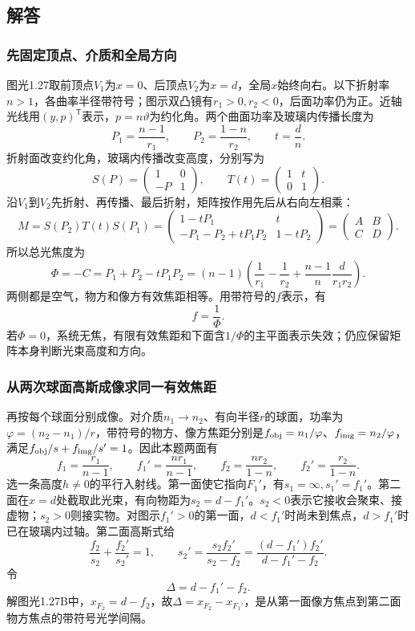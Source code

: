 \documentclass[UTF8,fontset=fandol,a4paper,11pt]{ctexart}
\begin{document}
\subsection*{解答}


\subsubsection*{先固定顶点、介质和全局方向}
图光1.27取前顶点$V_1$为$x=0$、后顶点$V_2$为$x=d$，全局$x$始终向右。以下折射率$n>1$，各曲率半径带符号；图示双凸镜有$r_1>0,r_2<0$，后面功率仍为正。近轴光线用$(y,p)^{\mathsf T}$表示，$p=n\vartheta$为约化角。两个曲面功率及玻璃内传播长度为
\[
P_1=\frac{n-1}{r_1},\qquad
P_2=\frac{1-n}{r_2},\qquad t=\frac dn.
\]
折射面改变约化角，玻璃内传播改变高度，分别写为
\[
S(P)=\begin{pmatrix}1&0\\-P&1\end{pmatrix},
\qquad
T(t)=\begin{pmatrix}1&t\\0&1\end{pmatrix}.
\]
沿$V_1$到$V_2$先折射、再传播、最后折射，矩阵按作用先后从右向左相乘：
\[
M=S(P_2)T(t)S(P_1)
=\begin{pmatrix}
1-tP_1&t\\
-P_1-P_2+tP_1P_2&1-tP_2
\end{pmatrix}
=\begin{pmatrix}A&B\\C&D\end{pmatrix}.
\]
所以总光焦度为
\[
\Phi=-C=P_1+P_2-tP_1P_2
=(n-1)\left(\frac1{r_1}-\frac1{r_2}
+\frac{n-1}{n}\frac d{r_1r_2}\right).
\]
两侧都是空气，物方和像方有效焦距相等。用带符号的$f$表示，有
\[
\boxed{f=\frac1\Phi}.
\]
若$\Phi=0$，系统无焦，有限有效焦距和下面含$1/\Phi$的主平面表示失效；仍应保留矩阵本身判断光束高度和方向。

\subsubsection*{从两次球面高斯成像求同一有效焦距}
再按每个球面分别成像。对介质$n_1\to n_2$、有向半径$r$的球面，功率为$\varphi=(n_2-n_1)/r$，带符号的物方、像方焦距分别是$f_{\rm obj}=n_1/\varphi$、$f_{\rm img}=n_2/\varphi$，满足$f_{\rm obj}/s+f_{\rm img}/s'=1$。因此本题两面有
\[
f_1=\frac{r_1}{n-1},\qquad f_1'=\frac{nr_1}{n-1},
\qquad
f_2=\frac{nr_2}{1-n},\qquad f_2'=\frac{r_2}{1-n}.
\]
选一条高度$h\ne0$的平行入射线。第一面使它指向$F_1'$，有$s_1=\infty,s_1'=f_1'$。第二面在$x=d$处截取此光束，有向物距为$s_2=d-f_1'$。$s_2<0$表示它接收会聚束、接虚物；$s_2>0$则接实物。对图示$f_1'>0$的第一面，$d<f_1'$时尚未到焦点，$d>f_1'$时已在玻璃内过轴。第二面高斯式给
\[
\frac{f_2}{s_2}+\frac{f_2'}{s_2'}=1,\qquad
s_2'=\frac{s_2f_2'}{s_2-f_2}
=\frac{(d-f_1')f_2'}{d-f_1'-f_2}.
\]
令
\[
\Delta=d-f_1'-f_2.
\]
解图光1.27B中，$x_{F_2}=d-f_2$，故$\Delta=x_{F_2}-x_{F_1'}$，是从第一面像方焦点到第二面物方焦点的带符号光学间隔。
\end{document}

